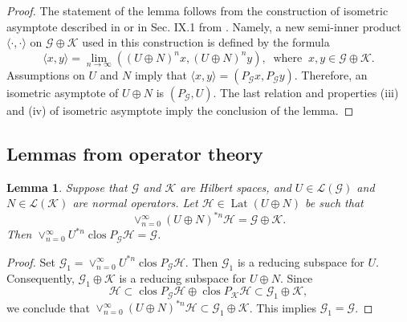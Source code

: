 \documentclass[a4paper,oneside,11pt]{amsart}
\numberwithin{equation}{section}
\theoremstyle{plain}
\newtheorem{lemma}[theorem]{Lemma}
\theoremstyle{definition}
\begin{document}
\begin{proof} The statement of the lemma follows from the construction of isometric asymptote described in 
\cite{k89} or in Sec. IX.1 from \cite{sznfbk}. Namely, a new semi-inner product $\langle \cdot,\cdot\rangle$ on $\mathcal G\oplus\mathcal K$ 
used in this construction 
 is defined by the formula 
\begin{equation*}\langle x,y\rangle=\lim_{n\to\infty}((U\oplus N)^nx,(U\oplus N)^ny), \ \text{ where }\ 
x, y\in \mathcal G\oplus\mathcal K.\end{equation*} 
Assumptions on $U$ and $N$ imply 
that $\langle x,y\rangle=(P_{\mathcal G}x,P_{\mathcal G}y)$. Therefore, an isometric asymptote of $U\oplus N$ 
is $ (P_{\mathcal G}, U)$. The last relation and properties (iii) and (iv) of isometric asymptote imply
 the conclusion of the lemma.
\end{proof}
   
\subsection{Lemmas from operator theory}


\begin{lemma}\label{lemminimal} Suppose that $\mathcal G$ and $\mathcal K$ are  Hilbert spaces, and  $U\in \mathcal L(\mathcal G)$ and 
$N\in \mathcal L(\mathcal K)$  are normal operators. 
Let $\mathcal H\in\operatorname{Lat}(U\oplus N)$ be such that
\begin{equation} \label{minimal}\vee_{n=0}^\infty (U\oplus N)^{*n}\mathcal H=\mathcal G\oplus\mathcal K .
 \end{equation}
Then  $\vee_{n=0}^\infty U^{*n}\operatorname{clos}P_{\mathcal G}\mathcal H=\mathcal G$.
\end{lemma}

\begin{proof}
Set $\mathcal G_1=\vee_{n=0}^\infty U^{*n}\operatorname{clos}P_{\mathcal G}\mathcal H$.  
Then $\mathcal G_1$ is a reducing subspace for $U$. Consequently, $\mathcal G_1\oplus\mathcal K$ is 
a reducing subspace for $U\oplus N$. 
Since 
\begin{equation*} \mathcal H\subset\operatorname{clos}P_{\mathcal G}\mathcal H\oplus\operatorname{clos}
P_{\mathcal K}\mathcal H
\subset\mathcal G_1\oplus\mathcal K, 
 \end{equation*}
we conclude that 
$\vee_{n=0}^\infty (U\oplus N)^{*n}\mathcal H\subset\mathcal G_1\oplus\mathcal K$.  
This implies $\mathcal G_1=\mathcal G$. 
\end{proof}
\end{document}
